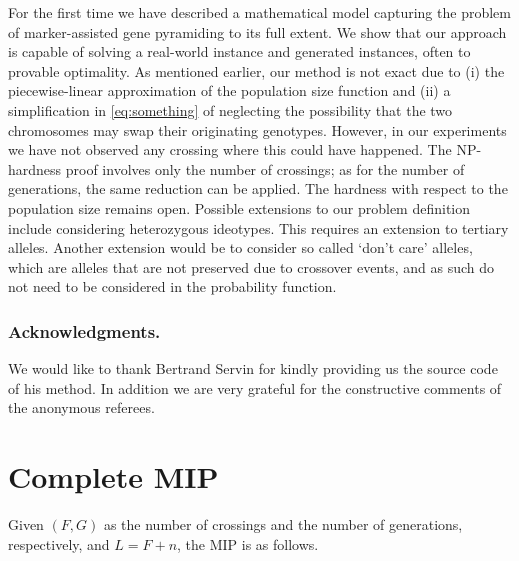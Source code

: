 \documentclass[runningheads]{llncs}
\begin{document}
For the first time we have described a mathematical model capturing the problem of marker-assisted gene pyramiding to its full extent. We show that our approach is capable of solving a real-world instance and generated instances, often to provable optimality.
As mentioned earlier, our method is not exact due to (i) the piecewise-linear approximation of the population size function and (ii) a simplification in \eqref{eq:something} of neglecting the possibility that the two chromosomes may swap their originating genotypes. However, in our experiments we have not observed any crossing where this could have happened. 
The NP-hardness proof involves only the number of crossings; as for the number of generations, the same reduction can be applied. The hardness with respect to the population size remains open. Possible extensions to our problem definition include considering heterozygous ideotypes. This requires an extension to tertiary alleles. Another extension would be to consider so called `don't care' alleles, which are alleles that are not preserved due to crossover events, and as such do not need to be considered in the probability function.

\subsubsection{Acknowledgments.} We would like to thank Bertrand Servin for kindly providing us the source code of his method. In addition we are very grateful for the constructive comments of the anonymous referees.




\appendix
 

\section{Complete MIP}
\label{sec:complete_mip}

Given $(F, G)$ as the number of crossings and the number of generations, respectively, and $L = F + n$, the MIP is as follows.
\end{document}
